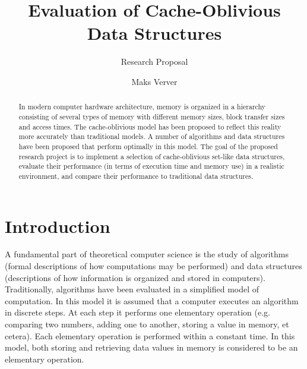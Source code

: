 \documentclass{acm_proc_article-sp}
\begin{document}
\title{Evaluation of Cache-Oblivious Data Structures}
\subtitle{Research Proposal}

\author{Maks Verver\\ }


\maketitle

\begin{abstract}
In modern computer hardware architecture, memory is organized in a hierarchy consisting of several types of memory with different memory sizes, block transfer sizes and access times. The cache-oblivious model has been proposed to reflect this reality more accurately than traditional models. A number of algorithms and data structures have been proposed that perform optimally in this model. The goal of the proposed research project is to implement a selection of cache-oblivious set-like data structures, evaluate their performance (in terms of execution time and memory use) in a realistic environment, and compare their performance to traditional data structures.
\end{abstract}


\section{Introduction}
A fundamental part of theoretical computer science is the study of algorithms (formal descriptions of how computations may be performed) and data structures (descriptions of how information is organized and stored in computers). Traditionally, algorithms have been evaluated in a simplified model of computation. In this model it is assumed that a computer executes an algorithm in discrete steps. At each step it performs one elementary operation (e.g. comparing two numbers, adding one to another, storing a value in memory, et cetera). Each elementary operation is performed within a constant time. In this model, both storing and retrieving data values in memory is considered to be an elementary operation.
\end{document}
